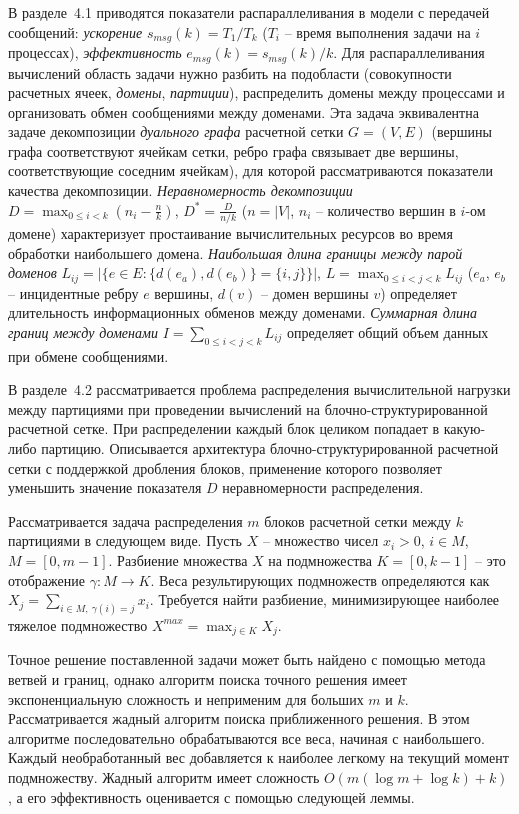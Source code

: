 \documentclass[a4paper,14pt]{extarticle}                     %
\theoremstyle{plain}                                         %
\begin{document}
В разделе~4.1 приводятся показатели распараллеливания в модели с передачей сообщений: \textit{ускорение} $s_{msg}(k) = T_1/T_k$ ($T_i$ -- время выполнения задачи на $i$ процессах), \textit{эффективность} $e_{msg}(k) = s_{msg}(k)/k$.
Для распараллеливания вычислений область задачи нужно разбить на подобласти (совокупности расчетных ячеек, \textit{домены}, \textit{партиции}), распределить домены между процессами и организовать обмен сообщениями между доменами.
Эта задача эквивалентна задаче декомпозиции \textit{дуального графа} расчетной сетки $G = (V, E)$ (вершины графа соответствуют ячейкам сетки, ребро графа связывает две вершины, соответствующие соседним ячейкам), для которой рассматриваются показатели качества декомпозиции.
\textit{Неравномерность декомпозиции} $D = \max_{0 \le i < k}{ \left( n_i - \frac{n}{k} \right) }$, $D^{*} = \frac{D}{n/k}$ ($n = |V|$, $n_i$ -- количество вершин в $i$-ом домене) характеризует простаивание вычислительных ресурсов во время обработки наибольшего домена.
\textit{Наибольшая длина границы между парой доменов} $L_{ij} = \left| \{ e \in E: \{ d(e_a), d(e_b) \} = \{ i, j \} \} \right|$, $L = \max_{0 \le i < j < k}{L_{ij}}$ ($e_a$, $e_b$ -- инцидентные ребру $e$ вершины, $d(v)$ -- домен вершины $v$) определяет длительность информационных обменов между доменами.
\textit{Суммарная длина границ между доменами} $I = \sum_{0 \le i < j < k}{L_{ij}}$ определяет общий объем данных при обмене сообщениями.


В разделе~4.2 рассматривается проблема распределения вычислительной нагрузки между партициями при проведении вычислений на блочно-структу\-рированной расчетной сетке.
При распределении каждый блок целиком попадает в какую-либо партицию.
Описывается архитектура блочно-структуриро\-ванной расчетной сетки с поддержкой дробления блоков, применение которого позволяет уменьшить значение показателя $D$ неравномерности распределения.

Рассматривается задача распределения $m$ блоков расчетной сетки между $k$ партициями в следующем виде.
Пусть $X$ -- множество чисел $x_i > 0$, $i \in M$, $M = [0, m - 1]$.
Разбиение множества $X$ на подмножества $K = [0, k - 1]$ -- это отображение $\gamma: M \rightarrow K$.
Веса результирующих подмножеств определяются как $X_j = \sum_{i \in M, \ \gamma(i) = j}{x_i}$.
Требуется найти разбиение, минимизирующее наиболее тяжелое подмножество $X^{max} = \max_{j \in K}{X_j}$.

Точное решение поставленной задачи может быть найдено с помощью метода ветвей и границ, однако алгоритм поиска точного решения имеет экспоненциальную сложность и неприменим для больших $m$ и $k$.
Рассматривается жадный алгоритм поиска приближенного решения.
В этом алгоритме последовательно обрабатываются все веса, начиная с наибольшего.
Каждый необработанный вес добавляется к наиболее легкому на текущий момент подмножеству.
Жадный алгоритм имеет сложность $O(m(\log m + \log k) + k)$, а его эффективность оценивается с помощью следующей леммы.
\end{document}
